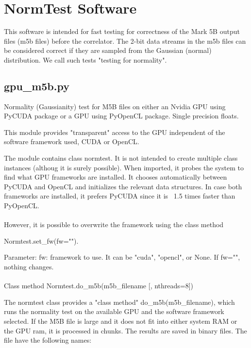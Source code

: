 \documentclass[letterpaper,twoside,12pt]{article}
\begin{document}

\section{NormTest Software}

This software is intended for fast testing for correctness of the Mark 5B output
files (m5b files) before the correlator. The 2-bit data streams in the m5b files
can be considered correct if they are sampled from the Gaussian (normal)
distribution. We call such tests "testing for normality".

\subsection{gpu\_m5b.py}

Normality (Gaussianity) test for M5B files on either an Nvidia GPU using PyCUDA
package or a GPU using PyOpenCL package. Single precision floats.

This module provides "transparent" access to the GPU independent of the
software framework used, CUDA or OpenCL.

The module contains class normtest. It is not intended to create multiple
class instances (althoug it is surely possible). When imported, it 
probes the system to find what GPU frameworks are installed. It chooses
automatically between PyCUDA and OpenCL and initializes the relevant 
data structures. In case both frameworks are installed, it prefers
PyCUDA since it is ~1.5 times faster than PyOpenCL. \\


 \\
However, it is possible to overwrite the framework using the class method

Normtest.set_fw(fw="").

Parameter:
    fw: framework to use. It can be "cuda", "opencl", or None.
        If fw="", nothing changes. \\
\\

    Class method Normtest.do_m5b(m5b_filename [, nthreads=8])

The normtest class provides a "class method" do_m5b(m5b_filename),
which runs the normality test on the available GPU and the software
framework selected. If the M5B file is large and it does not fit into either
system RAM or the GPU ram, it is processed in chunks. The results are saved 
in binary files.  The file have the following names:
\end{document}
